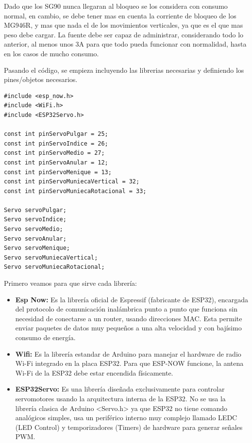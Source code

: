 \documentclass[10pt]{article}
\begin{document}
Dado que los SG90 nunca llegaran al bloqueo se los considera con consumo normal, en cambio, se debe tener mas en cuenta la corriente de bloqueo de los MG946R, y mas que nada el de los movimientos verticales, ya que es el que mas peso debe cargar. La fuente debe ser capaz de administrar, considerando todo lo anterior, al menos unos 3A para que todo pueda funcionar con normalidad, hasta en los casos de mucho consumo. 


Pasando el código, se empieza incluyendo las librerias necesarias y definiendo los pines/objetos necesarios.

\begin{lstlisting}
#include <esp_now.h>
#include <WiFi.h>
#include <ESP32Servo.h>

const int pinServoPulgar = 25; 
const int pinServoIndice = 26; 
const int pinServoMedio = 27; 
const int pinServoAnular = 12; 
const int pinServoMenique = 13;
const int pinServoMuniecaVertical = 32; 
const int pinServoMuniecaRotacional = 33; 

Servo servoPulgar;
Servo servoIndice;
Servo servoMedio;
Servo servoAnular;
Servo servoMenique;
Servo servoMuniecaVertical;
Servo servoMuniecaRotacional;
\end{lstlisting}

Primero veamos para que sirve cada librería:

\begin{itemize}
    \item \textbf{Esp Now:}
        Es la librería oficial de Espressif (fabricante de ESP32), encargada del protocolo de comunicación inalámbrica punto a punto que funciona sin necesidad de conectarse a un router, usando direcciones MAC. Esta permite enviar paquetes de datos muy pequeños a una alta velocidad y con bajísimo consumo de energía.
    \item \textbf{Wifi:}
        Es la librería estandar de Arduino para manejar el hardware de radio Wi-Fi integrado en la placa ESP32. Para que ESP-NOW funcione, la antena Wi-Fi de la ESP32 debe estar encendida físicamente.
    \item \textbf{ESP32Servo:}
        Es una librería diseñada exclusivamente para controlar servomotores usando la arquitectura interna de la ESP32. No se usa la librería clasica de Arduino <Servo.h> ya que ESP32 no tiene comando analógicos simples, usa un periférico interno muy complejo llamado LEDC (LED Control) y temporizadores (Timers) de hardware para generar señales PWM.
\end{itemize}
\end{document}
